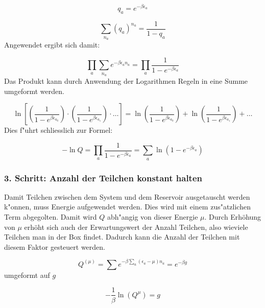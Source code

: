 \begin{refsection}
\begin{equation}
q_a = e^{- \beta \epsilon_a}
\end{equation}

\begin{equation}
\sum_{n_a} (q_a)^{n_a} = \frac {1}{1-q_a}
\end{equation}
Angewendet ergibt sich damit:

\begin{equation}
    \prod_{a} \sum_{n_a} e^{- \beta \epsilon_a n_a } = \prod_{a} \frac {1}{1-e^{- \beta \epsilon_a}}
\end{equation}
Das Produkt kann durch Anwendung der Logarithmen Regeln in eine Summe umgeformt werden.

\begin{equation}
\ln \left[ \left( \frac{1}{1-e^{\beta \epsilon_{a_0}}} \right) \cdot \left( \frac{1}{1-e^{ \beta \epsilon_{a_1}}} \right) \cdot \dots \right] = \ln \left( \frac{1}{1-e^{\beta \epsilon_{a_0}}} \right) + \ln \left( \frac{1}{1-e^{\beta \epsilon_{a_1}}} \right) + \dots
\end{equation}
Dies f"uhrt schliesslich zur Formel:

\begin{equation}
- \ln Q = \prod_{a} \frac {1}{1-e^{- \beta \epsilon_a}} = \sum_{a} \ln \left( 1-e^{- \beta \epsilon_a} \right)
\end{equation}

\subsubsection{3. Schritt: Anzahl der Teilchen konstant halten}

Damit Teilchen zwischen dem System und dem Reservoir ausgetauscht werden k"onnen, muss Energie aufgewendet werden.
Dies wird mit einem zus"atzlichen Term abgegolten. Damit wird $Q$ abh"angig von dieser Energie $\mu$. Durch Erhöhung von $\mu$ erhöht sich auch der Erwartungswert der Anzahl Teilchen, also wieviele Teilchen man in der Box findet. Dadurch kann die Anzahl der Teilchen mit diesem Faktor gesteuert werden. \cite{bose:feynman}


\begin{equation}
Q^{(\mu)} = \sum e^{- \beta \sum_{a} (\epsilon_a - \mu)n_a} = e^{-\beta g}
\end{equation}
umgeformt auf $g$

\begin{equation}
-\frac{1}{ \beta } \ln(Q^{\mu}) = g
\end{equation}
  

\end{refsection}
